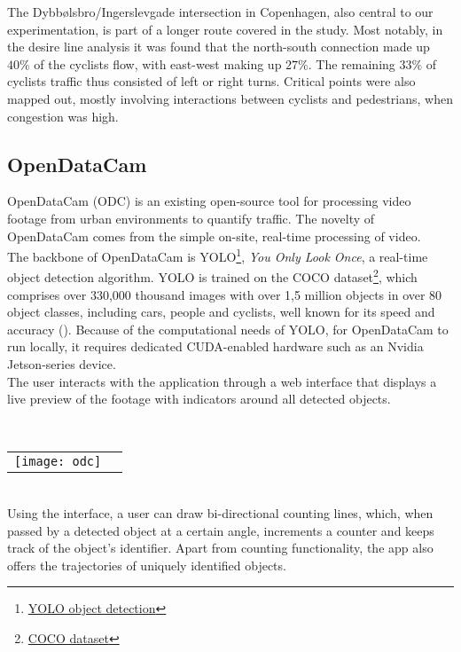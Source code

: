 The Dybbølsbro/Ingerslevgade intersection in Copenhagen, also central to our experimentation, is part of a longer route covered in the study.
Most notably, in the desire line analysis it was found that the north-south connection made up $40\%$ of the cyclists flow, with east-west making up
$27\%$. The remaining $33\%$ of cyclists traffic thus consisted of left or right turns.
Critical points were also mapped out, mostly involving interactions between cyclists and pedestrians, when congestion was high.
\ \\



\subsection{OpenDataCam}
OpenDataCam (ODC) is an existing open-source tool for processing video footage from urban environments to quantify
traffic. The novelty of OpenDataCam comes from the simple on-site, real-time processing of video. 
\ \\

The backbone of OpenDataCam is YOLO\footnote{\href{https://pjreddie.com/darknet/yolo/}{YOLO object detection}}, \textit{You Only Look Once}, a real-time object detection algorithm. 
YOLO is trained on the COCO dataset\footnote{\href{https://cocodataset.org}{COCO dataset}}, which comprises over 330,000 thousand images
with over 1,5 million objects in over 80 object classes, including cars, people and cyclists, well known for its speed and accuracy (\cite{redmon2016look}). 
Because of the computational needs of YOLO, for OpenDataCam to run locally, it requires dedicated CUDA-enabled hardware such as an Nvidia Jetson-series device. 
\ \\

The user interacts with the application through a web interface that displays a live preview of the footage with
indicators around all detected objects.

\ \\
\raggedbottom
\noindent
\begin{tabular}{@{}cc}
\texttt{[image: odc]} 
\end{tabular}
\ \\

Using the interface, a user can draw bi-directional counting lines, which, when passed by a detected object at a certain angle, 
increments a counter and keeps track of the object's identifier. Apart from counting functionality, the app also offers the trajectories of uniquely identified objects. 

\raggedbottom